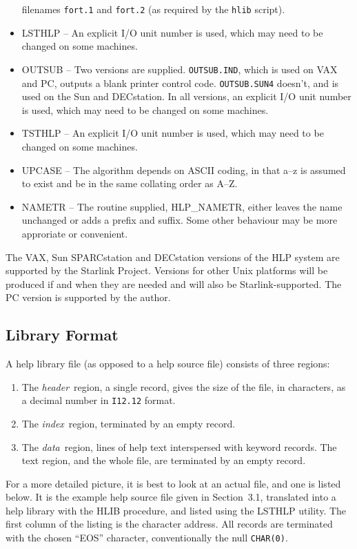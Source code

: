 \begin{itemize}
filenames {\tt fort.1} and {\tt fort.2} (as required by the {\tt hlib}
script).
\item LSTHLP -- An explicit I/O unit number is used, which may need to
be changed on some machines.
\item OUTSUB -- Two versions are supplied.
{\tt OUTSUB.IND}, which is used on VAX and PC, outputs
a blank printer control code. {\tt OUTSUB.SUN4} doesn't, and is
used on the Sun and DECstation.
In all versions, an explicit I/O unit number is used,
which may need to be changed on some machines.
\item TSTHLP -- An explicit I/O unit number is used, which may need to
be changed on some machines.
\item UPCASE -- The algorithm depends on ASCII coding, in that
a--z is assumed to exist and be in the same collating order as A--Z.
\item NAMETR -- The routine supplied, HLP\_NAMETR, either leaves
the name unchanged or adds a prefix and suffix.  Some
other behaviour may be more approriate or convenient.
\end{itemize}

The VAX, Sun SPARCstation and DECstation versions of the HLP system
are supported by the Starlink Project.  Versions for other Unix
platforms will be produced if and when they are needed and will
also be Starlink-supported.  The PC version is supported by the author.

\subsection{Library Format}
A help library file (as opposed to a help source file)
consists of three regions:
\begin{enumerate}
\item The {\it header}\, region, a single record, gives the size of the
file, in characters, as a decimal number in {\tt I12.12} format.
\item The {\it index}\, region, terminated by an empty record.
\item The {\it data}\, region, lines of help
text interspersed with keyword records.  The text region, and
the whole file, are terminated by an empty record.
\end{enumerate}

For a more detailed picture, it is best to look at an
actual file, and one is listed below.  It is the
example help source file given in Section~3.1, translated
into a help library with the HLIB procedure, and listed using the
LSTHLP utility.
The first column of the listing is the character address.  All
records are terminated with the chosen ``EOS'' character,
conventionally the null {\tt CHAR(0)}.

